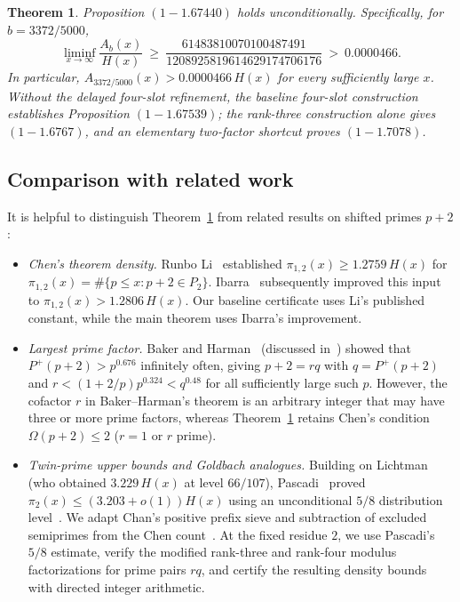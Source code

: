 \documentclass[11pt,reqno]{amsart}
\newtheorem{theorem}{Theorem}[section]
\theoremstyle{remark}
\numberwithin{equation}{section}
\begin{document}
\begin{theorem}\label{thm:main}
Proposition $(1-1.67440)$ holds unconditionally. Specifically, for $b = 3372/5000$,
\begin{equation}\label{eq:main_margin}
\liminf_{x\to\infty}\frac{A_b(x)}{H(x)}
\ \ge\ \frac{61483810070100487491}{1208925819614629174706176}
\ >\ 0.0000466.
\end{equation}
In particular, $A_{3372/5000}(x) > 0.0000466\,H(x)$ for every sufficiently large $x$. Without the delayed four-slot refinement, the baseline four-slot construction establishes Proposition $(1-1.67539)$; the rank-three construction alone gives $(1-1.6767)$, and an elementary two-factor shortcut proves $(1-1.7078)$.
\end{theorem}

\subsection{Comparison with related work}
It is helpful to distinguish Theorem~\ref{thm:main} from related results on shifted primes $p+2$:
\begin{itemize}
\item \emph{Chen's theorem density.} Runbo Li~\cite[Theorem~1.3]{RunboLi2026} established $\pi_{1,2}(x) \ge 1.2759\,H(x)$ for $\pi_{1,2}(x) = \#\{p \le x : p+2 \in P_2\}$. Ibarra~\cite[Theorem~B]{Ibarra2026} subsequently improved this input to $\pi_{1,2}(x)>1.2806\,H(x)$. Our baseline certificate uses Li's published constant, while the main theorem uses Ibarra's improvement.
\item \emph{Largest prime factor.} Baker and Harman~\cite{BakerHarman1996} (discussed in~\cite[\S 1.4]{LiLiu2026}) showed that $P^+(p+2) > p^{0.676}$ infinitely often, giving $p+2 = rq$ with $q=P^+(p+2)$ and $r < (1+2/p)p^{0.324} < q^{0.48}$ for all sufficiently large such $p$. However, the cofactor $r$ in Baker--Harman's theorem is an arbitrary integer that may have three or more prime factors, whereas Theorem~\ref{thm:main} retains Chen's condition $\Omega(p+2) \le 2$ ($r=1$ or $r$ prime).
\item \emph{Twin-prime upper bounds and Goldbach analogues.} Building on Lichtman~\cite{Lichtman2023} (who obtained $3.229\,H(x)$ at level $66/107$), Pascadi~\cite[Corollary~1.4]{Pascadi2025} proved $\pi_2(x) \le (3.203 + o(1))H(x)$ using an unconditional $5/8$ distribution level~\cite[Proposition~4.4 and Theorem~5.4]{Pascadi2025}. We adapt Chan's positive prefix sieve and subtraction of excluded semiprimes from the Chen count~\cite[\S\S 4 and 8 and Appendix~F]{Chan2026}. At the fixed residue $2$, we use Pascadi's $5/8$ estimate, verify the modified rank-three and rank-four modulus factorizations for prime pairs $rq$, and certify the resulting density bounds with directed integer arithmetic.
\end{itemize}
\end{document}
